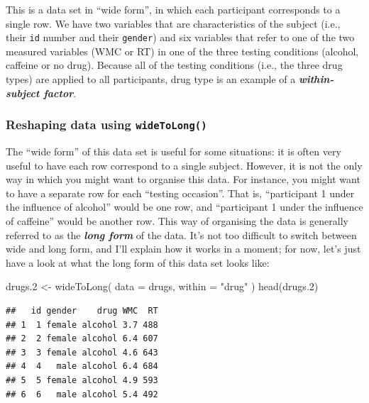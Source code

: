 \documentclass[
]{book}
\newenvironment{Shaded}{\begin{snugshade}}{\end{snugshade}}
\newcommand{\AttributeTok}[1]{\textcolor[rgb]{0.77,0.63,0.00}{#1}}
\newcommand{\FloatTok}[1]{\textcolor[rgb]{0.00,0.00,0.81}{#1}}
\newcommand{\FunctionTok}[1]{\textcolor[rgb]{0.00,0.00,0.00}{#1}}
\newcommand{\NormalTok}[1]{#1}
\newcommand{\OtherTok}[1]{\textcolor[rgb]{0.56,0.35,0.01}{#1}}
\newcommand{\StringTok}[1]{\textcolor[rgb]{0.31,0.60,0.02}{#1}}
\begin{document}
This is a data set in ``wide form'', in which each participant corresponds to a single row. We have two variables that are characteristics of the subject (i.e., their \texttt{id} number and their \texttt{gender}) and six variables that refer to one of the two measured variables (WMC or RT) in one of the three testing conditions (alcohol, caffeine or no drug). Because all of the testing conditions (i.e., the three drug types) are applied to all participants, drug type is an example of a \textbf{\emph{within-subject factor}}.

\hypertarget{reshaping-data-using-widetolong}{%
\subsubsection{\texorpdfstring{Reshaping data using \texttt{wideToLong()}}{Reshaping data using wideToLong()}}\label{reshaping-data-using-widetolong}}

The ``wide form'' of this data set is useful for some situations: it is often very useful to have each row correspond to a single subject. However, it is not the only way in which you might want to organise this data. For instance, you might want to have a separate row for each ``testing occasion''. That is, ``participant 1 under the influence of alcohol'' would be one row, and ``participant 1 under the influence of caffeine'' would be another row. This way of organising the data is generally referred to as the \textbf{\emph{long form}} of the data. It's not too difficult to switch between wide and long form, and I'll explain how it works in a moment; for now, let's just have a look at what the long form of this data set looks like:

\begin{Shaded}
\begin{Highlighting}[]
\NormalTok{drugs}\FloatTok{.2} \OtherTok{\textless{}{-}} \FunctionTok{wideToLong}\NormalTok{( }\AttributeTok{data =}\NormalTok{ drugs, }\AttributeTok{within =} \StringTok{"drug"}\NormalTok{ )}
\FunctionTok{head}\NormalTok{(drugs}\FloatTok{.2}\NormalTok{)}
\end{Highlighting}
\end{Shaded}

\begin{verbatim}
##   id gender    drug WMC  RT
## 1  1 female alcohol 3.7 488
## 2  2 female alcohol 6.4 607
## 3  3 female alcohol 4.6 643
## 4  4   male alcohol 6.4 684
## 5  5 female alcohol 4.9 593
## 6  6   male alcohol 5.4 492
\end{verbatim}
\end{document}
